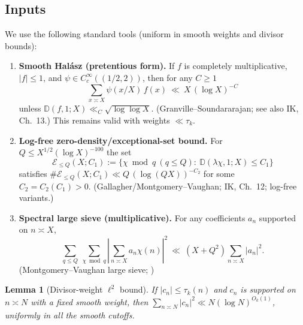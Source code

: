 \documentclass[11pt]{article}
\newtheorem{lemma}{Lemma}[part]
\theoremstyle{definition}
\theoremstyle{remark}
\numberwithin{equation}{part}
\begin{document}
\subsection*{Inputs}
We use the following standard tools (uniform in smooth weights and divisor bounds):
\begin{enumerate}[label=(I\arabic*)]
	\item \textbf{Smooth Halász (pretentious form).}
	      If $f$ is completely multiplicative, $|f|\le1$, and $\psi\in C_c^\infty((1/2,2))$, then for any $C\ge1$
	      \[
		      \sum_{x\asymp X} \psi(x/X)\,f(x)
		      \ \ll\ X\,(\log X)^{-C}
	      \]
	      unless $\mathbb D(f,1;X)\ll_C \sqrt{\log\log X}$. (Granville--Soundararajan; see also IK, Ch.~13.) This remains valid with weights $\ll \tau_k$.
	\item \textbf{Log-free zero-density/exceptional-set bound.}
	      For $Q\le X^{1/2}(\log X)^{-100}$ the set
	      \[
		      \mathcal E_{\le Q}(X;C_1):=\Big\{\chi\bmod q \ (q\le Q):\  \mathbb D(\lambda\chi,1;X)\le C_1\Big\}
	      \]
	      satisfies $\#\mathcal E_{\le Q}(X;C_1)\ll Q\,(\log (QX))^{-C_2}$ for some $C_2=C_2(C_1)>0$. (Gallagher/Montgomery--Vaughan; IK, Ch.~12; log-free variants.)
	\item \textbf{Spectral large sieve (multiplicative).}
	      For any coefficients $a_n$ supported on $n\asymp X$,
	      \[
		      \sum_{q\le Q}\ \sum_{\chi\bmod q}\left|\sum_{n\asymp X} a_n \chi(n)\right|^2
		      \ \ll\ (X+Q^2)\sum_{n\asymp X}|a_n|^2.
	      \]
	      (Montgomery--Vaughan large sieve; \cite[Thm.~7.13]{IK})
\end{enumerate}

\begin{lemma}[Divisor-weight $\ell^2$ bound]\label{lem:l2-div}
	If $|c_n|\le \tau_k(n)$ and $c_n$ is supported on $n\asymp N$ with a fixed smooth weight, then
	$\sum_{n\asymp N}|c_n|^2\ll N(\log N)^{O_k(1)}$, uniformly in all the smooth cutoffs.
\end{lemma}
\end{document}
